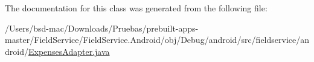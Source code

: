 The documentation for this class was generated from the following file\+:\begin{DoxyCompactItemize}
\item 
/\+Users/bsd-\/mac/\+Downloads/\+Pruebas/prebuilt-\/apps-\/master/\+Field\+Service/\+Field\+Service.\+Android/obj/\+Debug/android/src/fieldservice/android/\hyperlink{_expenses_adapter_8java}{Expenses\+Adapter.\+java}\end{DoxyCompactItemize}
